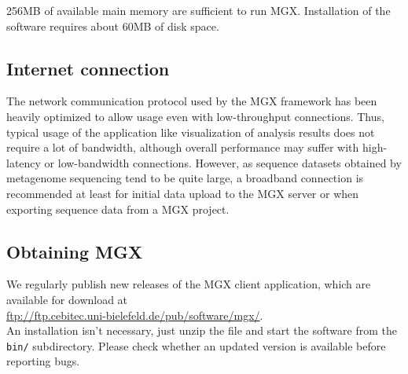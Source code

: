256MB of available main memory are sufficient to run MGX. Installation of the
software requires about 60MB of disk space.

\subsection{Internet connection}

The network communication protocol used by the MGX framework has been heavily optimized to
allow usage even with low-throughput connections. Thus, typical usage of the application
like visualization of analysis results does not require a lot of bandwidth, although
overall performance may suffer with high-latency or low-bandwidth connections. However, as
sequence datasets obtained by metagenome sequencing tend to be quite large, a broadband 
connection is recommended at least for initial data upload to the MGX server or when exporting
sequence data from a MGX project.

\subsection{Obtaining MGX}

We regularly publish new releases of the MGX client application, which are
available for download at\\

    \url{ftp://ftp.cebitec.uni-bielefeld.de/pub/software/mgx/}.\\

An installation isn't necessary, just unzip the file and start the software
from the \texttt{bin/} subdirectory. Please check whether an updated version
is available before reporting bugs.

